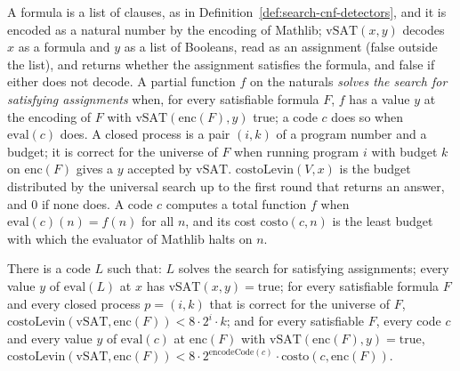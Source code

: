 \begin{definition}
  \label{def:search-resuelve-sat}
  \leanok
  A formula is a list of clauses, as in Definition~\ref{def:search-cnf-detectors}, and it is encoded
  as a natural number by the encoding of Mathlib; $\mathrm{vSAT}(x, y)$ decodes $x$ as a formula
  and $y$ as a list of Booleans, read as an assignment (false outside the list), and returns
  whether the assignment satisfies the formula, and false if either does not decode. A partial
  function $f$ on the naturals \emph{solves the search for satisfying assignments} when, for every
  satisfiable formula $F$, $f$ has a value $y$ at the encoding of $F$ with $\mathrm{vSAT}(\mathrm{enc}(F), y)$
  true; a code $c$ does so when $\mathrm{eval}(c)$ does. A closed process is a pair $(i, k)$ of a program
  number and a budget; it is correct for the universe of $F$ when running program $i$ with budget $k$
  on $\mathrm{enc}(F)$ gives a $y$ accepted by $\mathrm{vSAT}$. $\mathrm{costoLevin}(V, x)$ is the budget
  distributed by the universal search up to the first round that returns an answer, and $0$ if none
  does. A code $c$ computes a total function $f$ when $\mathrm{eval}(c)(n) = f(n)$ for all $n$, and
  its cost $\mathrm{costo}(c, n)$ is the least budget with which the evaluator of Mathlib halts on $n$.
  \own{}
\end{definition}

\begin{theorem}
  \label{thm:search-construir-es-resolver}
  \leanok
  There is a code $L$ such that: $L$ solves the search for satisfying assignments; every value
  $y$ of $\mathrm{eval}(L)$ at $x$ has $\mathrm{vSAT}(x, y) = \mathrm{true}$; for every satisfiable formula
  $F$ and every closed process $p = (i, k)$ that is correct for the universe of $F$,
  $\mathrm{costoLevin}(\mathrm{vSAT}, \mathrm{enc}(F)) < 8 \cdot 2^{i} \cdot k$; and for every satisfiable
  $F$, every code $c$ and every value $y$ of $\mathrm{eval}(c)$ at $\mathrm{enc}(F)$ with
  $\mathrm{vSAT}(\mathrm{enc}(F), y) = \mathrm{true}$,
  $\mathrm{costoLevin}(\mathrm{vSAT}, \mathrm{enc}(F)) < 8 \cdot 2^{\mathrm{encodeCode}(c)} \cdot \mathrm{costo}(c, \mathrm{enc}(F))$.
  \own{}
\end{theorem}


